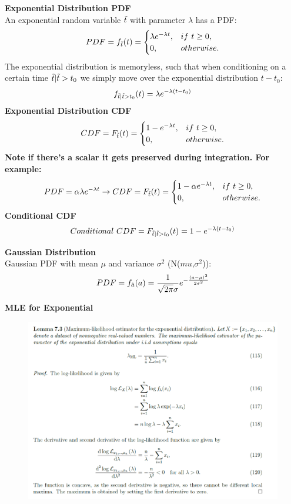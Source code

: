 \documentclass[12pt,twoside]{article}
\newcommand{\ra}{\Tilde{a}}
\newcommand{\rt}{\Tilde{t}}
\begin{document}
\textbf{Exponential Distribution PDF}\\
An exponential random variable $\rt$ with parameter $\lambda$ has a PDF:
$$
    PDF = f_{\rt}(t) = \begin{cases} \lambda e ^{-\lambda t}, & if \ t \geq 0, \\
    0, & otherwise.\end{cases}
$$
The exponential distribution is memoryless, such that when conditioning on a certain time $\rt|\rt>t_0$ we simply move over the exponential distribution $t-t_0$:
$$
    f_{\rt|\rt>t_0}(t) = \lambda e^{-\lambda (t-t_0)}
$$
\textbf{Exponential Distribution CDF}\\
$$
    CDF = F_{\rt}(t) = \begin{cases} 1 - e ^{-\lambda t}, & if \ t \geq 0, \\
    0, & otherwise.\end{cases}
$$
\textbf{Note if there's a scalar it gets preserved during integration. For example:}
$$
        PDF = \alpha \lambda e^{-\lambda t} \rightarrow CDF = F_{\rt}(t) = \begin{cases} 1 - \alpha e ^{-\lambda t}, & if \ t \geq 0, \\
    0, & otherwise.\end{cases}
$$
\textbf{Conditional CDF}
$$
    Conditional \ CDF = F_{\rt|\rt>t_0}(t) = 1 - e^{-\lambda(t-t_0)}
$$

\textbf{Gaussian Distribution}\\
Gaussian PDF with mean $\mu$ and variance $\sigma^2$ (N($mu$,$\sigma^2$)):
$$
    PDF = f_{\ra}(a) = \frac{1}{\sqrt{2\pi}\sigma}e^{-\frac{(a-\mu)^2}{2\sigma^2}}
$$

\textbf{MLE for Exponential}\\
\begin{figure}[h]
    \centering
    \includegraphics[scale=.38]{loglikelihood_exponential.png}
    \label{fig:my_label}
\end{figure}
\end{document}
